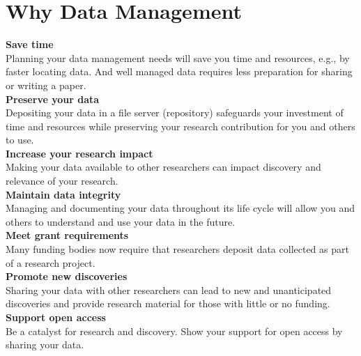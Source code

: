 \section{Why Data Management}

\textbf{Save time} \\
Planning your data management needs will save you time and resources, e.g.,
by faster locating data. And well managed data requires less preparation for
sharing or writing a paper. \\[6pt]
\textbf{Preserve your data} \\
Depositing your data in a file server (repository) safeguards your investment
of time and resources while preserving your research contribution for you and
others to use. \\[6pt]
\textbf{Increase your research impact} \\
Making your data available to other researchers can impact discovery and
relevance of your research. \\[6pt]
\textbf{Maintain data integrity} \\
Managing and documenting your data throughout its life cycle will allow you
and others to understand and use your data in the future. \\[6pt]
\textbf{Meet grant requirements} \\
Many funding bodies now require that researchers deposit data collected as
part of a research project. \\[6pt]
\textbf{Promote new discoveries} \\
Sharing your data with other researchers can lead to new and unanticipated
discoveries and provide research material for those with little or no funding. \\[6pt]
\textbf{Support open access} \\
Be a catalyst for research and discovery. Show your support for open access
by sharing your data.

